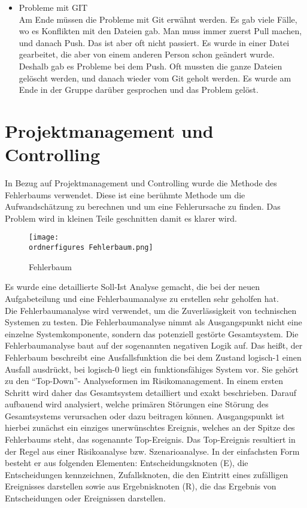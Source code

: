 \begin{itemize}
		\item Probleme mit GIT \\
		
		Am Ende müssen die Probleme mit Git erwähnt werden. Es gab viele Fälle, wo es Konflikten mit den Dateien gab. Man muss immer zuerst Pull machen, und danach Push. Das ist aber oft nicht passiert. Es wurde in einer Datei gearbeitet, die aber von einem anderen Person schon geändert wurde. Deshalb gab es Probleme bei dem Push. Oft mussten die ganze Dateien gelöscht werden, und danach wieder vom Git geholt werden. Es wurde am Ende in der Gruppe darüber gesprochen und das Problem gelöst.
	\end{itemize}

	\section{Projektmanagement und Controlling}
	In Bezug auf Projektmanagement und Controlling wurde die Methode des Fehlerbaums verwendet. Diese ist eine ber{\"u}hmte Methode um die Aufwandsch{\"a}tzung zu berechnen und um eine Fehlerursache zu finden. Das Problem wird in kleinen Teile geschnitten damit es klarer wird. 
	\begin{figure}		
		\texttt{[image: \\ordnerfigures Fehlerbaum.png]}
		\caption{Fehlerbaum}
		\label{fig:Fehlerbaum}
	\end{figure}
	Es wurde eine detaillierte Soll-Ist Analyse gemacht, die bei der neuen Aufgabeteilung und eine Fehlerbaumanalyse zu erstellen sehr geholfen hat.\\
	
	Die Fehlerbaumanalyse wird verwendet, um die Zuverlässigkeit von technischen Systemen zu testen. Die Fehlerbaumanalyse nimmt als Ausgangspunkt nicht eine einzelne Systemkomponente, sondern das potenziell gestörte Gesamtsystem. Die Fehlerbaumanalyse baut auf der sogenannten negativen Logik auf. Das heißt, der Fehlerbaum beschreibt eine Ausfallsfunktion die bei dem Zustand logisch-1 einen Ausfall ausdrückt, bei logisch-0 liegt ein funktionsfähiges System vor.
	Sie gehört zu den ``Top-Down''- Analyseformen im Risikomanagement. In einem ersten Schritt wird daher das Gesamtsystem detailliert und exakt beschrieben. Darauf aufbauend wird analysiert, welche primären Störungen eine Störung des Gesamtsystems verursachen oder dazu beitragen können. Ausgangspunkt ist hierbei zunächst ein einziges unerwünschtes Ereignis, welches an der Spitze des Fehlerbaums steht, das sogenannte Top-Ereignis. Das Top-Ereignis resultiert in der Regel aus einer Risikoanalyse bzw. Szenarioanalyse.
	In der einfachsten Form besteht er aus folgenden Elementen: Entscheidungsknoten (E), die Entscheidungen kennzeichnen, Zufallsknoten, die den Eintritt eines zufälligen Ereignisses darstellen sowie aus Ergebnisknoten (R), die das Ergebnis von Entscheidungen oder Ereignissen darstellen.
	
